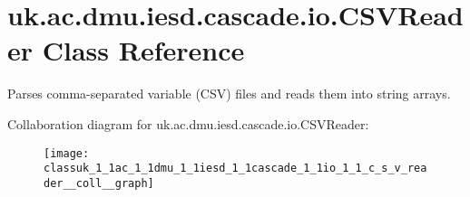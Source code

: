 \hypertarget{classuk_1_1ac_1_1dmu_1_1iesd_1_1cascade_1_1io_1_1_c_s_v_reader}{\section{uk.\-ac.\-dmu.\-iesd.\-cascade.\-io.\-C\-S\-V\-Reader Class Reference}
\label{classuk_1_1ac_1_1dmu_1_1iesd_1_1cascade_1_1io_1_1_c_s_v_reader}
}


Parses comma-\/separated variable (C\-S\-V) files and reads them into string arrays.  




Collaboration diagram for uk.\-ac.\-dmu.\-iesd.\-cascade.\-io.\-C\-S\-V\-Reader\-:\nopagebreak
\begin{figure}[H]
\begin{center}
\leavevmode
\texttt{[image: classuk\_1\_1ac\_1\_1dmu\_1\_1iesd\_1\_1cascade\_1\_1io\_1\_1\_c\_s\_v\_reader\_\_coll\_\_graph]}
\end{center}
\end{figure}
